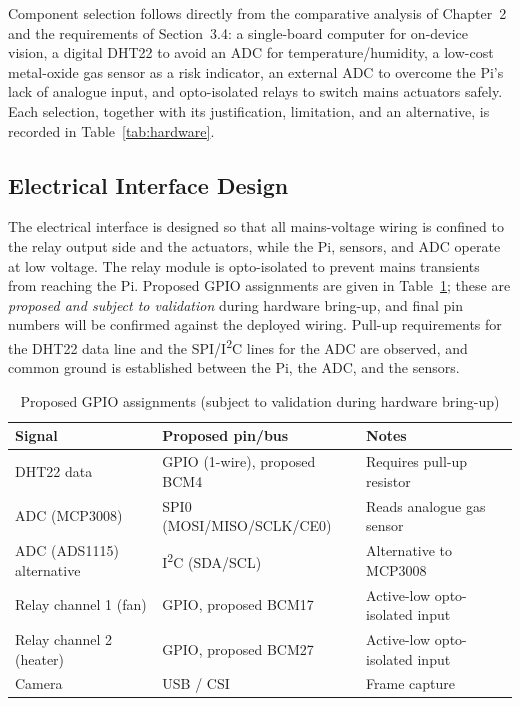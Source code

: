 \documentclass[12pt,a4paper]{report}
\begin{document}
Component selection follows directly from the comparative analysis of Chapter~2 and the requirements of Section~3.4: a single-board computer for on-device vision, a digital DHT22 to avoid an ADC for temperature/humidity, a low-cost metal-oxide gas sensor as a risk indicator, an external ADC to overcome the Pi's lack of analogue input, and opto-isolated relays to switch mains actuators safely. Each selection, together with its justification, limitation, and an alternative, is recorded in Table~\ref{tab:hardware}.

\subsection{Electrical Interface Design}

The electrical interface is designed so that all mains-voltage wiring is confined to the relay output side and the actuators, while the Pi, sensors, and ADC operate at low voltage. The relay module is opto-isolated to prevent mains transients from reaching the Pi. Proposed GPIO assignments are given in Table~\ref{tab:gpio}; these are \emph{proposed and subject to validation} during hardware bring-up, and final pin numbers will be confirmed against the deployed wiring. Pull-up requirements for the DHT22 data line and the SPI/I\textsuperscript{2}C lines for the ADC are observed, and common ground is established between the Pi, the ADC, and the sensors.

\begin{table}[tbp]
\caption{Proposed GPIO assignments (subject to validation during hardware bring-up)}
\label{tab:gpio}
\centering
\small
\begin{tabularx}{\textwidth}{|l|l|X|}
\hline
\rowcolor{headerblue}
\textbf{Signal} & \textbf{Proposed pin/bus} & \textbf{Notes} \\
\hline
DHT22 data & GPIO (1-wire), proposed BCM4 & Requires pull-up resistor \\
\hline
ADC (MCP3008) & SPI0 (MOSI/MISO/SCLK/CE0) & Reads analogue gas sensor \\
\hline
ADC (ADS1115) alternative & I\textsuperscript{2}C (SDA/SCL) & Alternative to MCP3008 \\
\hline
Relay channel 1 (fan) & GPIO, proposed BCM17 & Active-low opto-isolated input \\
\hline
Relay channel 2 (heater) & GPIO, proposed BCM27 & Active-low opto-isolated input \\
\hline
Camera & USB / CSI & Frame capture \\
\hline
\end{tabularx}
\end{table}
\end{document}
